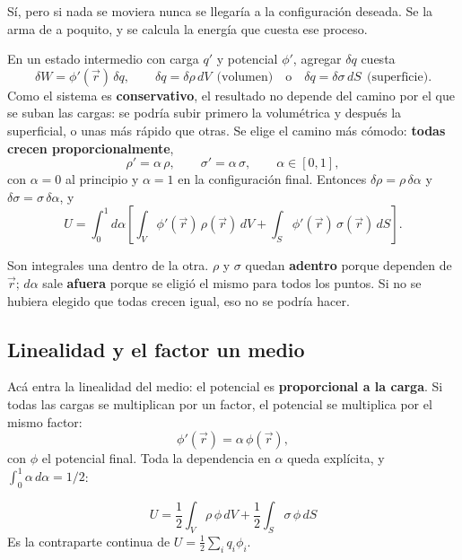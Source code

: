 \documentclass[12pt,a4paper]{article}
\begin{document}
\begin{notebox}
Sí, pero si nada se moviera nunca se llegaría a la configuración deseada. Se la
arma de a poquito, y se calcula la energía que cuesta ese proceso.
\end{notebox}

En un estado intermedio con carga $q'$ y potencial $\phi'$, agregar $\delta q$
cuesta
\[
\delta W = \phi'(\vec r)\,\delta q,
\qquad
\delta q = \delta\rho\,dV \ \ \text{(volumen)}
\quad\text{o}\quad
\delta q = \delta\sigma\,dS \ \ \text{(superficie)}.
\]
Como el sistema es \textbf{conservativo}, el resultado no depende del camino por
el que se suban las cargas: se podría subir primero la volumétrica y después la
superficial, o unas más rápido que otras. Se elige el camino más cómodo:
\textbf{todas crecen proporcionalmente},
\[
\rho' = \alpha\,\rho,\qquad \sigma' = \alpha\,\sigma,\qquad \alpha\in[0,1],
\]
con $\alpha=0$ al principio y $\alpha=1$ en la configuración final. Entonces
$\delta\rho = \rho\,\delta\alpha$ y $\delta\sigma = \sigma\,\delta\alpha$, y
\[
U = \int_0^1 d\alpha\left[\int_V \phi'(\vec r)\,\rho(\vec r)\,dV
+ \int_S \phi'(\vec r)\,\sigma(\vec r)\,dS\right].
\]

\begin{notebox}
Son integrales una dentro de la otra. $\rho$ y $\sigma$ quedan \textbf{adentro}
porque dependen de $\vec r$; $d\alpha$ sale \textbf{afuera} porque se eligió el
mismo para todos los puntos. Si no se hubiera elegido que todas crecen igual, eso
no se podría hacer.
\end{notebox}

\subsection{Linealidad y el factor un medio}

Acá entra la linealidad del medio: el potencial es \textbf{proporcional a la
carga}. Si todas las cargas se multiplican por un factor, el potencial se
multiplica por el mismo factor:
\[
\phi'(\vec r) = \alpha\,\phi(\vec r),
\]
con $\phi$ el potencial final. Toda la dependencia en $\alpha$ queda explícita, y
$\int_0^1 \alpha\,d\alpha = 1/2$:

\begin{keybox}
\[
\boxed{\ U = \frac12\int_V \rho\,\phi\,dV + \frac12\int_S \sigma\,\phi\,dS\ }
\]
Es la contraparte continua de $U = \tfrac12\sum_i q_i\phi_i$.
\end{keybox}
\end{document}
